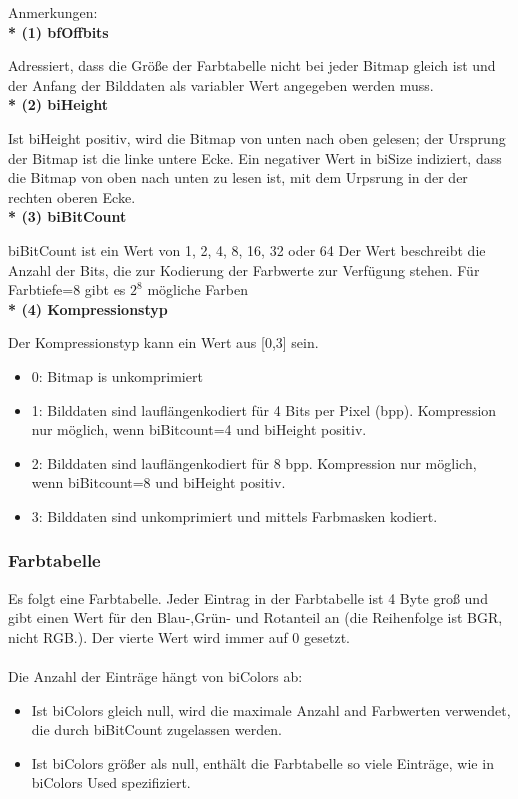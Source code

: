 \documentclass[11pt]{scrartcl}
\begin{document}
Anmerkungen: \\

\textbf{* (1) bfOffbits}

Adressiert, dass die Größe der Farbtabelle nicht bei jeder Bitmap gleich ist und der Anfang der Bilddaten als variabler Wert angegeben werden muss.  \\


\textbf{* (2) biHeight} 

Ist biHeight positiv, wird die Bitmap von unten nach oben gelesen; der Ursprung der Bitmap ist die linke untere Ecke. 
Ein negativer Wert in biSize indiziert, dass die Bitmap von oben nach unten zu lesen ist, mit dem Urpsrung in der der rechten oberen Ecke.\\


\textbf{* (3) biBitCount} 

 biBitCount ist ein Wert von 1, 2, 4, 8, 16, 32 oder 64
Der Wert beschreibt die Anzahl der Bits, die zur Kodierung der Farbwerte zur Verfügung stehen. Für Farbtiefe=8 gibt es $2^8$ mögliche Farben\\


\textbf{ * (4) Kompressionstyp}

Der Kompressionstyp kann ein Wert aus [0,3] sein.
\begin{itemize}
\item 0: Bitmap is unkomprimiert
\item 1: Bilddaten sind lauflängenkodiert für 4 Bits per Pixel (bpp). Kompression nur            möglich, wenn biBitcount=4 und biHeight positiv.
\item 2: Bilddaten sind lauflängenkodiert für 8 bpp. Kompression nur möglich, wenn                biBitcount=8 und biHeight positiv.
\item 3: Bilddaten sind unkomprimiert und mittels Farbmasken kodiert.

\end{itemize}

\subsubsection{Farbtabelle}
Es folgt eine Farbtabelle.
Jeder Eintrag in der Farbtabelle ist 4 Byte groß und gibt einen Wert für den Blau-,Grün- und Rotanteil an (die Reihenfolge ist BGR, nicht RGB.). Der vierte Wert wird immer auf 0 gesetzt.\\\\

Die Anzahl der Einträge hängt von biColors ab:
\begin{itemize}
\item Ist biColors gleich null, wird die maximale Anzahl and Farbwerten verwendet, die durch biBitCount zugelassen werden.
\item Ist biColors größer als null, enthält die Farbtabelle so viele Einträge, wie in biColors Used spezifiziert. 
\end{itemize}
\end{document}
